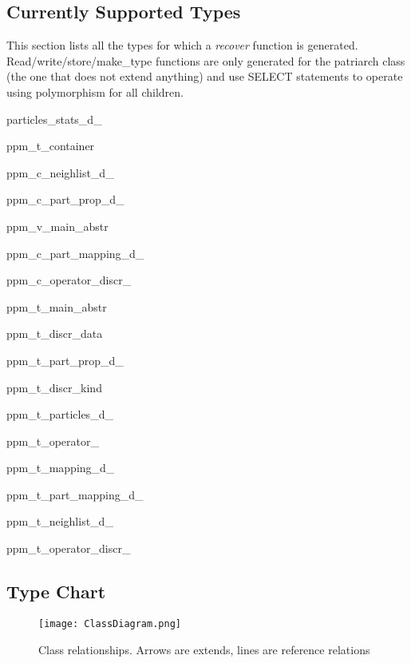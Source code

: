 \documentclass{article}
\begin{document}
\subsection{Currently Supported Types}
This section lists all the types for which a \emph{recover} function is generated. Read/write/store/make\_type functions are only generated for the patriarch class (the one that does not extend anything) and use SELECT statements to operate using polymorphism for all children.
\begin{list}{}{}
\item particles\_stats\_d\_
\item ppm\_t\_container
\item ppm\_c\_neighlist\_d\_
\item ppm\_c\_part\_prop\_d\_
\item ppm\_v\_main\_abstr
\item ppm\_c\_part\_mapping\_d\_
\item ppm\_c\_operator\_discr\_
\item ppm\_t\_main\_abstr
\item ppm\_t\_discr\_data
\item ppm\_t\_part\_prop\_d\_
\item ppm\_t\_discr\_kind
\item ppm\_t\_particles\_d\_
\item ppm\_t\_operator\_
\item ppm\_t\_mapping\_d\_
\item ppm\_t\_part\_mapping\_d\_
\item ppm\_t\_neighlist\_d\_
\item ppm\_t\_operator\_discr\_
\end{list}

\subsection{Type Chart}
\begin{figure}[h!]
   \label{fig.typechart}
   \texttt{[image: ClassDiagram.png]}
   \caption{Class relationships. Arrows are extends, lines are reference relations}
\end{figure}
\end{document}
